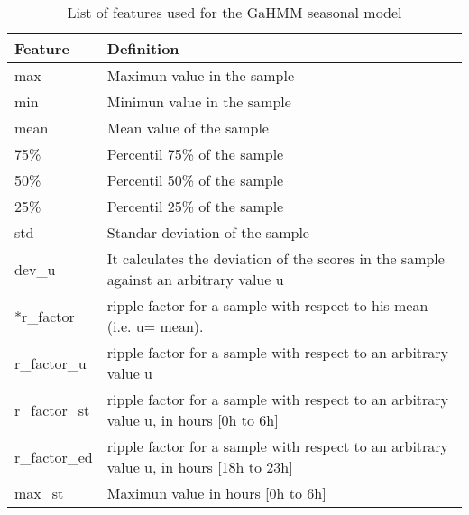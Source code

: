 \begin{table}[htbp]
  \centering
  \scriptsize
  \caption{List of features used for the GaHMM seasonal model}
    \begin{tabular}{lr}
    \hline
    \multicolumn{1}{|l|}{\textbf{Feature}} & \multicolumn{1}{l|}{\textbf{Definition}} \bigstrut\\
    \hline
    \multicolumn{1}{|l|}{max } & \multicolumn{1}{l|}{Maximun value in the sample} \bigstrut\\
    \hline
    \multicolumn{1}{|l|}{min} & \multicolumn{1}{l|}{Minimun value in the sample} \bigstrut\\
    \hline
    \multicolumn{1}{|l|}{mean } & \multicolumn{1}{l|}{Mean value of the sample} \bigstrut\\
    \hline
    \multicolumn{1}{|l|}{75\%} & \multicolumn{1}{l|}{Percentil 75\% of the sample} \bigstrut\\
    \hline
    \multicolumn{1}{|l|}{50\%} & \multicolumn{1}{l|}{Percentil 50\% of the sample} \bigstrut\\
    \hline
    \multicolumn{1}{|l|}{25\%} & \multicolumn{1}{l|}{Percentil 25\% of the sample} \bigstrut\\
    \hline
    \multicolumn{1}{|l|}{std} & \multicolumn{1}{l|}{Standar deviation of the sample} \bigstrut\\
    \hline
    \multicolumn{1}{|l|}{dev\_u} & \multicolumn{1}{l|}{It calculates the deviation of the scores in the sample against an arbitrary value u} \bigstrut\\
    \hline
    \multicolumn{1}{|l|}{*r\_factor} & \multicolumn{1}{l|}{ripple factor for a sample with respect to his mean (i.e. u= mean).} \bigstrut\\
    \hline
    \multicolumn{1}{|l|}{r\_factor\_u} & \multicolumn{1}{l|}{ripple factor for a sample with respect to an arbitrary value u} \bigstrut\\
    \hline
    \multicolumn{1}{|l|}{r\_factor\_st} & \multicolumn{1}{l|}{ripple factor for a sample with respect to an arbitrary value u, in hours [0h to 6h]} \bigstrut\\
    \hline
    \multicolumn{1}{|l|}{r\_factor\_ed} & \multicolumn{1}{l|}{ripple factor for a sample with respect to an arbitrary value u, in hours [18h to 23h]} \bigstrut\\
    \hline
    \multicolumn{1}{|l|}{max\_st} & \multicolumn{1}{l|}{Maximun value in hours [0h to 6h]} \bigstrut\\

\end{tabular}
\end{table}
